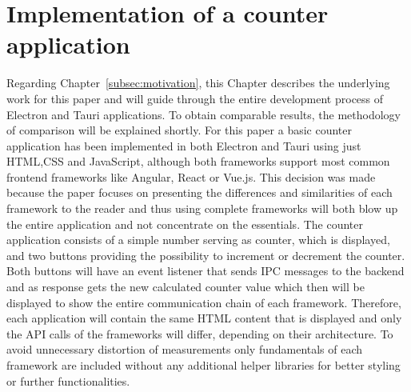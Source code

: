 \section{Implementation of a counter \\ application}
\label{sec:implementation}
Regarding Chapter~\ref{subsec:motivation}, this Chapter describes the underlying work for this paper and will guide through the entire development process of Electron and Tauri applications.
To obtain comparable results, the methodology of comparison will be explained shortly.
For this paper a basic counter application has been implemented in both Electron and Tauri using just \ac{HTML},\ac{CSS} and JavaScript, although both frameworks support most common frontend frameworks like Angular, React or Vue.js.
This decision was made because the paper focuses on presenting the differences and similarities of each framework to the reader and thus using complete frameworks will both blow up the entire application and not concentrate on the essentials.
The counter application consists of a simple number serving as counter, which is displayed, and two buttons providing the possibility to increment or decrement the counter.
Both buttons will have an event listener that sends \ac{IPC} messages to the backend and as response gets the new calculated counter value which then will be displayed to show the entire communication chain of each framework.
Therefore, each application will contain the same \ac{HTML} content that is displayed and only the \ac{API} calls of the frameworks will differ, depending on their architecture.
To avoid unnecessary distortion of measurements only fundamentals of each framework are included without any additional helper libraries for better styling or further functionalities.


